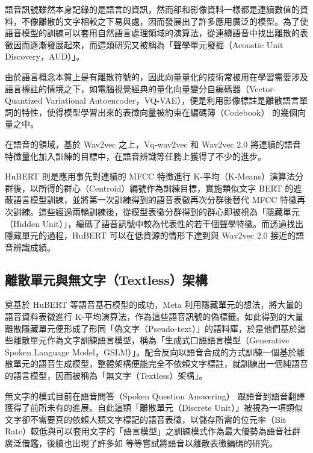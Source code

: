 語音訊號雖然本身記錄的是語言的資訊，然而卻和影像資料一樣都是連續數值的資料，不像離散的文字相較之下易與處，因而發展出了許多應用廣泛的模型。為了使語音模型的訓練可以套用自然語言處理領域的演算法，從連續語音中找出離散的表徵因而逐漸發展起來，而這類研究又被稱為「聲學單元發掘（Acoustic Unit Discovery，AUD）」。

由於語言概念本質上是有離散符號的，因此向量量化的技術常被用在學習需要涉及語言標註的情境之下，如電腦視覺經典的量化向量變分自編碼器（Vector-Quantized Variational Autoencoder，VQ-VAE）\cite{van2017neural}，便是利用影像標註是離散語言單詞的特性，使得模型學習出來的表徵向量被約束在編碼簿（Codebook） 的幾個向量之中。

在語音的領域，基於 Wav2vec 之上，Vq-wav2vec \cite{baevski2019vq} 和 Wav2vec 2.0 將連續的語音特徵量化加入訓練的目標中，在語音辨識等任務上獲得了不少的進步。

HuBERT 則是應用事先對連續的 MFCC 特徵進行 K-平均（K-Means）演算法分群後，以所得的群心（Centroid）編號作為訓練目標，實施類似文字 BERT 的遮蔽語言模型訓練，並將第一次訓練得到的語音表徵再次分群後替代 MFCC 特徵再次訓練。這些經過兩輪訓練後，從模型表徵分群得到的群心即被視為「隱藏單元（Hidden Unit）」，編碼了語音訊號中較為代表性的若干個聲學特徵。而透過找出隱藏單元的過程，HuBERT 可以在低資源的情形下達到與 Wav2vec 2.0 接近的語音辨識成績。

\subsection{離散單元與無文字（Textless）架構}

奠基於 HuBERT 等語音基石模型的成功，Meta 利用隱藏單元的想法，將大量的語音資料表徵進行 K-平均演算法，作為這些語音訊號的偽標籤。如此得到的大量離散隱藏單元便形成了形同「偽文字（Pseudo-text）」的語料庫，於是他們基於這些離散單元作為文字訓練語言模型，稱為「生成式口語語言模型（Generative Spoken Language Model，GSLM）」。配合反向以語音合成的方式訓練一個基於離散單元的語音生成模型，整體架構便能完全不依賴文字標註，就訓練出一個純語音的語言模型，因而被稱為「無文字（Textless）架構」\cite{noauthor_textless_2021}。

無文字的模式目前在語音問答（Spoken Question Answering）\cite{lin2022dual} 跟語音到語音翻譯 \cite{chen_speech--speech_2023} 獲得了前所未有的進展。自此這類「離散單元（Discrete Unit）」被視為一項類似文字卻不需要真的依賴人類文字標記的語音表徵，以儲存所需的位元率（Bit Rate）較低與可以套用文字的「語言模型」之訓練模式作為最大優勢為語音社群廣泛借鑑，後續也出現了許多如 \cite{zhang2024speechtokenizer} 等等嘗試將語音以離散表徵編碼的研究。

